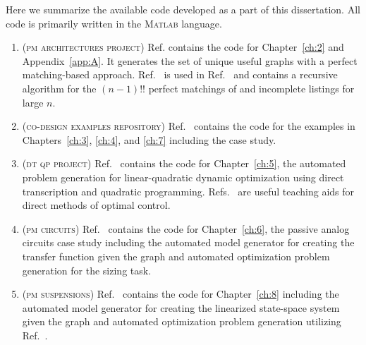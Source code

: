 
Here we summarize the available code developed as a part of this dissertation. All code is primarily written in the \textsc{Matlab} language.

\begin{enumerate}[label=$\bullet$, widest=$\bullet$, nosep]

\item \textsc{(pm architectures project)} Ref.\cite{github-pm-architectures-project} contains the code for Chapter~\ref{ch:2} and Appendix~\ref{app:A}. It generates the set of unique useful graphs with a perfect matching-based approach.
Ref.~\cite{github-perfect-matchings-of-a-complete-graph} is used in Ref.~\cite{github-pm-architectures-project} and contains a recursive algorithm for the $(n-1)!!$ perfect matchings of  and incomplete listings for large $n$.

\item \textsc{(co-design examples repository}) Ref.~\cite{github-co-design-examples-repository} contains the code for the examples in Chapters~\ref{ch:3}, \ref{ch:4}, and \ref{ch:7} including the  case study. 

\item \textsc{(dt qp project)} Ref.~\cite{github-dt-qp-project} contains the code for Chapter~\ref{ch:5}, the automated problem generation for linear-quadratic dynamic optimization using direct transcription and quadratic programming. Refs.~\cite{github-optimal-control-direct-method-examples, github-basic-multiple-interval-pseudospectral} are useful teaching aids for direct methods of optimal control.

\item \textsc{(pm circuits)} Ref.~\cite{github-pm-circuits} contains the code for Chapter~\ref{ch:6}, the passive analog circuits case study including the automated model generator for creating the transfer function given the graph and automated optimization problem generation for the sizing task. 

\item \textsc{(pm suspensions)} Ref.~\cite{github-pm-suspensions} contains the code for Chapter~\ref{ch:8} including the automated model generator for creating the linearized state-space system given the graph and automated optimization problem generation utilizing Ref.~\cite{github-dt-qp-project}.

\end{enumerate}
